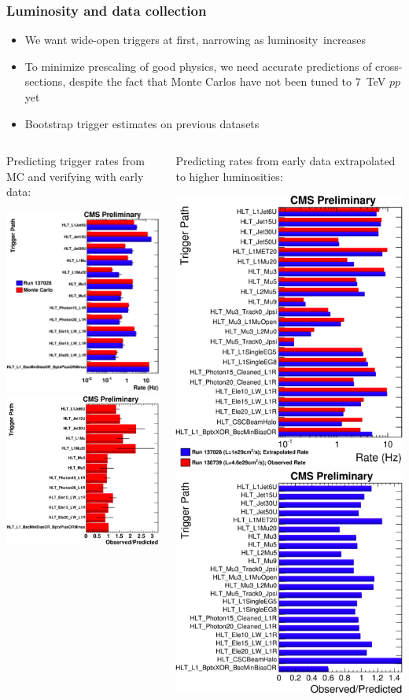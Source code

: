 \documentclass[compress]{beamer}
\begin{document}
\begin{frame}
\frametitle{Luminosity and data collection}

\begin{itemize}
\item We want wide-open triggers at first, narrowing as \mbox{luminosity increases\hspace{-1 cm}}

\item To minimize prescaling of good physics, we need accurate predictions of cross-sections, despite the fact that Monte Carlos have not been tuned to 7~TeV $pp$ yet

\item Bootstrap trigger estimates on previous datasets
\end{itemize}

\vspace{-0.3 cm}
\begin{columns}
\begin{center}
Predicting trigger rates from MC and verifying with early data:

\vspace{0.4 cm}
\includegraphics[height=2.8 cm]{trigger1.png}
\includegraphics[height=2.8 cm]{trigger2.png}
\end{center}
\begin{center}
Predicting rates from early data extrapolated to higher luminosities:

\vspace{0.4 cm}
\includegraphics[height=2.8 cm]{trigger3.png}
\includegraphics[height=2.8 cm]{trigger4.png}
\end{center}
\end{columns}


\end{frame}
\end{document}
